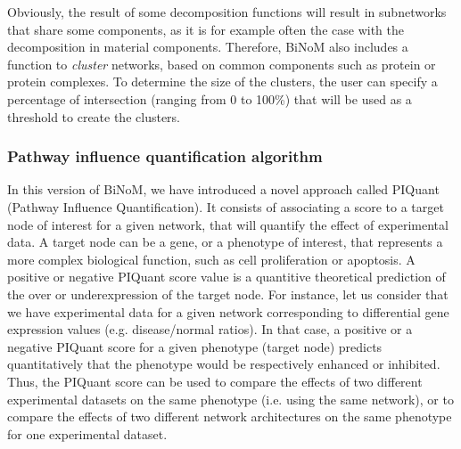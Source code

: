 \documentclass[10pt]{bmc_article}
\newenvironment{bmcformat}{\baselineskip20pt\sloppy\setboolean{publ}{false}}{\baselineskip20pt\sloppy}
\begin{document}
\begin{bmcformat}
Obviously, the result of some decomposition functions will result in subnetworks
that share some components, as it is for example often the case
with the decomposition in material components. Therefore, BiNoM also includes a
function to \emph{cluster} networks, based on common components such as protein
or protein complexes. To determine the size of the clusters, the user can
specify a percentage of intersection (ranging from 0 to 100\%) that will be used
as a threshold to create the clusters.

\subsubsection*{Pathway influence quantification algorithm}

In this version of BiNoM, we have introduced a novel approach called PIQuant
(Pathway Influence Quantification). It consists of associating a score to a
target node of interest for a given network, that will quantify the effect of
experimental data.
A target node can be a gene, or a phenotype of interest, that represents a more complex
biological function, such as cell proliferation or apoptosis.
A positive or negative PIQuant score value is a quantitive theoretical
prediction of the over or underexpression of
the target node. For instance, let us consider that we have experimental data for a given network
 corresponding to differential gene expression values (e.g.
disease/normal ratios).
In that case, a positive or a negative PIQuant score for a given phenotype
(target node) predicts quantitatively
that the phenotype would be respectively enhanced or inhibited. 
Thus, the PIQuant score can be used to
compare the effects of two different experimental datasets on the same phenotype
(i.e. using the same network), or to compare the effects of two different network
architectures on the same phenotype for one experimental dataset.



\end{bmcformat}
\end{document}
